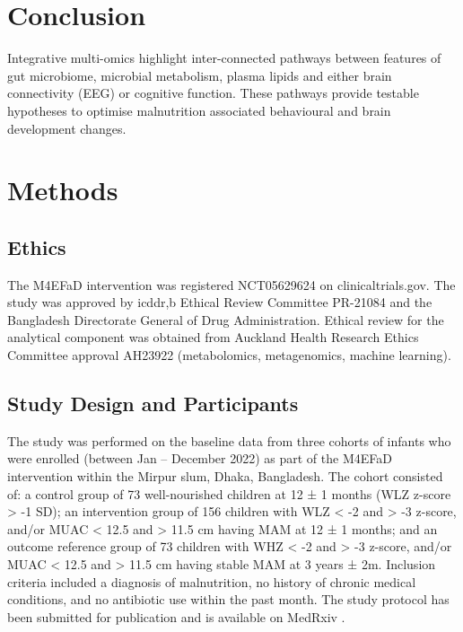 \documentclass{article}
\begin{document}
\section*{Conclusion}
Integrative multi-omics highlight inter-connected pathways between features of gut microbiome, microbial metabolism, plasma lipids and either brain connectivity (EEG) or cognitive function.
These pathways provide testable hypotheses to optimise malnutrition associated behavioural and brain development changes. 

\section*{Methods}
\subsection*{Ethics}
The M4EFaD intervention was registered NCT05629624 on clinicaltrials.gov.
The study was approved by icddr,b Ethical Review Committee PR-21084 and the Bangladesh Directorate General of Drug Administration.
Ethical review for the analytical component was obtained from Auckland Health Research Ethics Committee approval AH23922 (metabolomics, metagenomics, machine learning).

\subsection*{Study Design and Participants}
The study was performed on the baseline data from three cohorts of infants who were enrolled (between Jan – December 2022) as part of the M4EFaD intervention within the Mirpur slum, Dhaka, Bangladesh.
The cohort consisted of: a control group of 73 well-nourished children at 12 ± 1 months (WLZ z-score \textgreater{} -1 SD); an intervention group of 156 children with WLZ \textless{} -2 and \textgreater{} -3 z-score, and/or MUAC \textless{} 12.5 and \textgreater{} 11.5 cm having \gls{MAM} at 12 ± 1 months; and an outcome reference group of 73 children with WHZ \textless{} -2 and \textgreater{} -3 z-score, and/or \gls{MUAC} \textless{} 12.5 and \textgreater{} 11.5 cm having stable \gls{MAM} at 3 years ± 2m.
Inclusion criteria included a diagnosis of malnutrition, no history of chronic medical conditions, and no antibiotic use within the past month.
The study protocol has been submitted for publication and is available on MedRxiv \cite{shama2023multidimensional}.
\end{document}
